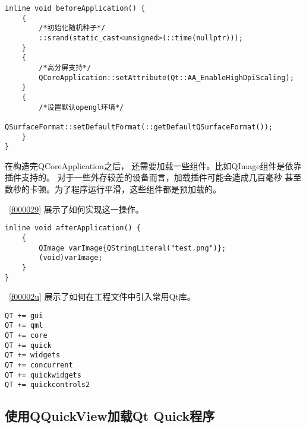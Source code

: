 \FloatBarrier
\begin{lstlisting}[label=f000028,
caption=GoodLuck,
title=\lstlistingname\ \thelstlisting\marginnote{\fbox{\footnotesize{\lstlistingname\ \thelstlisting}}}
,firstnumber=39]
inline void beforeApplication() {
    {
        /*初始化随机种子*/
        ::srand(static_cast<unsigned>(::time(nullptr)));
    }
    {
        /*高分屏支持*/
        QCoreApplication::setAttribute(Qt::AA_EnableHighDpiScaling);
    }
    {
        /*设置默认opengl环境*/
        QSurfaceFormat::setDefaultFormat(::getDefaultQSurfaceFormat());
    }
}
\end{lstlisting}          %

在构造完QCoreApplication之后，
还需要加载一些组件。比如QImage组件是依靠插件支持的。
对于一些外存较差的设备而言，加载插件可能会造成几百毫秒
甚至数秒的卡顿。为了程序运行平滑，这些组件都是预加载的。

\lstlistingname\ \ref{f000029}
展示了如何实现这一操作。

\FloatBarrier
\begin{lstlisting}[label=f000029,
caption=GoodLuck,
title=\lstlistingname\ \thelstlisting\marginnote{\fbox{\footnotesize{\lstlistingname\ \thelstlisting}}}
,firstnumber=54]
inline void afterApplication() {
    {
        QImage varImage{QStringLiteral("test.png")};
        (void)varImage;
    }
}
\end{lstlisting}          %

\lstlistingname\ \ref{f00002u}
展示了如何在工程文件中引入常用Qt库。

\FloatBarrier
\begin{lstlisting}[label=f00002u,
caption=GoodLuck,
title=\lstlistingname\ \thelstlisting\marginnote{\fbox{\footnotesize{\lstlistingname\ \thelstlisting}}}
]
QT += gui
QT += qml
QT += core
QT += quick
QT += widgets
QT += concurrent
QT += quickwidgets
QT += quickcontrols2
\end{lstlisting}          %

\FloatBarrier
\subsection{
使用QQuickView加载Qt Quick程序
}\label{ss001010}


